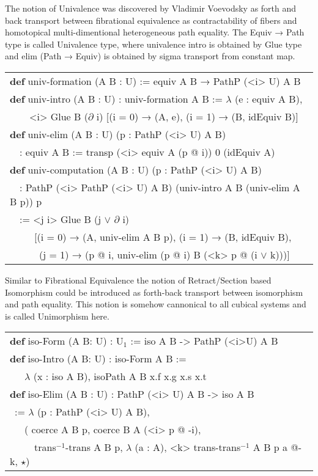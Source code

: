 \documentclass{article}
\theoremstyle{definition}
\newcommand{\tabstyle}[0]{\scriptsize\ttfamily\fontseries{l}\selectfont}
\begin{document}
The notion of Univalence was discovered by Vladimir Voevodsky
as forth and back transport between fibrational equivalence
as contractability of fibers and homotopical multi-dimentional
heterogeneous path equality. The Equiv → Path type is called Univalence type,
where univalence intro is obtained by Glue type and elim (Path → Equiv) is
obtained by sigma transport from constant map.

\begin{table}[ht]
\tabstyle
\begin{tabular}{l}
\textbf{def} univ-formation (A B : U) := equiv A B → PathP (<i> U) A B \\
\textbf{def} univ-intro (A B : U) : univ-formation A B := $\lambda$ (e : equiv A B), \\
\ \ \ \ <i> Glue B ($\partial$ i) [(i = 0) → (A, e), (i = 1) → (B, idEquiv B)] \\
\textbf{def} univ-elim (A B : U) (p : PathP (<i> U) A B) \\
\ \ : equiv A B := transp (<i> equiv A (p @ i)) 0 (idEquiv A) \\
\textbf{def} univ-computation (A B : U) (p : PathP (<i> U) A B) \\
\ \ : PathP (<i> PathP (<i> U) A B) (univ-intro A B (univ-elim A B p)) p \\
\ \ := <j i> Glue B (j $\vee$ $\partial$ i) \\
\ \ \ \ \ [(i = 0) → (A, univ-elim A B p), (i = 1) → (B, idEquiv B), \\
\ \ \ \ \ \ (j = 1) → (p @ i, univ-elim (p @ i) B (<k> p @ (i $\vee$ k)))] \\
\end{tabular}
\end{table}

Similar to Fibrational Equivalence the notion of Retract/Section based Isomorphism could be introduced
as forth-back transport between isomorphism and path equality. This notion is somehow cannonical to all
cubical systems and is called Unimorphism here.

\begin{table}[ht!]
\tabstyle
\begin{tabular}{l}
\textbf{def} iso-Form (A B: U) : U$_1$ := iso A B -> PathP (<i>U) A B \\
\textbf{def} iso-Intro (A B: U) : iso-Form A B := \\
\ \ \ $\lambda$ (x : iso A B), isoPath A B x.f x.g x.s x.t \\
\textbf{def} iso-Elim (A B : U) : PathP (<i> U) A B -> iso A B \\
\ := $\lambda$ (p : PathP (<i> U) A B), \\
\ \ \ ( coerce A B p, coerce B A (<i> p @ -i), \\
\ \ \ \ \ trans$^{-1}$-trans A B p, $\lambda$ (a : A), <k> trans-trans$^{-1}$ A B p a @-k, $\star$) \\
\end{tabular}
\end{table}
\end{document}
